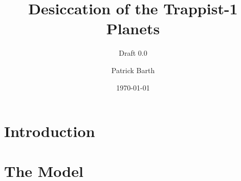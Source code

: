 \documentclass[abstract=on, letterpaper]{scrartcl}
\title{Desiccation of the Trappist-1 Planets}
\subtitle{Draft 0.0}
\author{Patrick Barth}
\date{\today}
\numberwithin{equation}{section}
\begin{document}
	
	
\maketitle
		
\tableofcontents
\newpage


\section{Introduction}

%
%


\section{The Model}
\label{Sec_Model}

\end{document}
